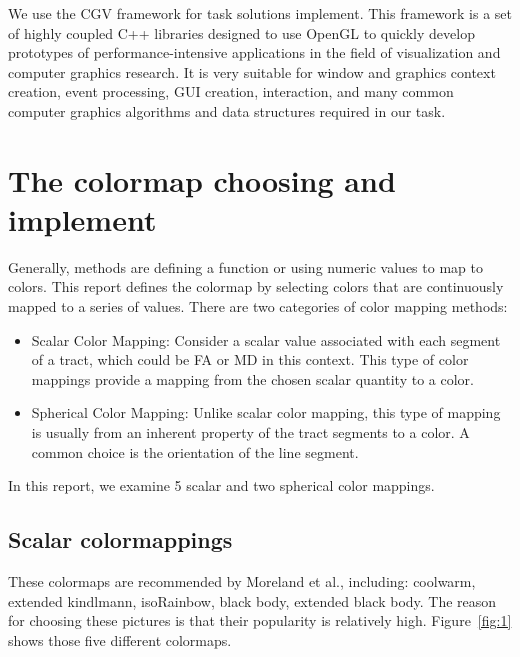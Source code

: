 \documentclass[hyperref, plainreport, noproblem]{cgvpub1}
\begin{document}
We use the CGV framework for task solutions implement. This framework is a set of highly coupled C++ libraries designed to use OpenGL to quickly develop prototypes of performance-intensive applications in the field of visualization and computer graphics research. It is very suitable for window and graphics context creation, event processing, GUI creation, interaction, and many common computer graphics algorithms and data structures required in our task.

\section{The colormap choosing and implement}
Generally, methods are defining a function or using numeric values to map to colors. This report defines the colormap by selecting colors that are continuously mapped to a series of values. 
There are two categories of color mapping methods:
\begin{itemize}
	\item Scalar Color Mapping: Consider a scalar value associated with each segment of a tract, which could  be FA or MD in this context. This type of color mappings provide a mapping from the chosen scalar quantity to a color. 
	\item Spherical Color Mapping: Unlike scalar color mapping, this type of mapping is usually from an inherent property of the tract segments to a color. A common choice is the orientation of the line segment. 
\end{itemize}

In this report, we examine 5 scalar and two spherical color mappings. 

\subsection*{Scalar colormappings}

These colormaps are recommended by Moreland et al., including: coolwarm, extended kindlmann, isoRainbow, black body, extended black body. The reason for choosing these pictures is that their popularity is relatively high. Figure~\ref{fig:1} shows those five different colormaps.
\end{document}
